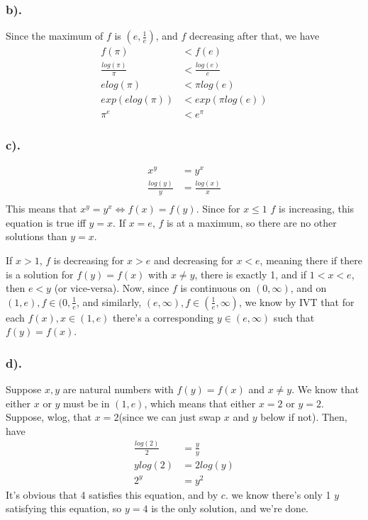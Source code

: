 \documentclass{article}
\begin{document}
\subsubsection*{b).}
Since the maximum of $f$ is $(e, \frac{1}{e})$, and $f$ decreasing after that, we have 
\begin{align*}
f(\pi) &< f(e)\\
\frac{log(\pi)}{\pi} &< \frac{log(e)}{e}\\
e log(\pi) &< \pi log(e)\\
exp(e log(\pi)) &< exp(\pi log(e))\\
\pi^{e} &< e^{\pi}
\end{align*}
\subsubsection*{c).}
\begin{align*}
x^{y} &= y^{x}\\
\frac{log(y)}{y} &= \frac{log(x)}{x}\\
\end{align*}
This means that $x^{y} = y^{x} \iff f(x) = f(y)$. 
Since for $x\leq 1$ $f$ is increasing, this equation is true iff $y = x$. If $x = e$, $f$ is at a maximum, so there are no other solutions than $y=x$. 

If $x > 1$, $f$ is decreasing for $x>e$ and decreasing for $x<e$, meaning there if there is a solution for $f(y) = f(x)$ with $x \neq y$, there is exactly 1, and  if $1 < x < e$, then $ e < y$ (or vice-versa). Now, since $f$ is continuous on $(0, \infty)$, and on $(1, e), f \in (0, \frac{1}{e}$, and similarly, $(e, \infty), f \in (\frac{1}{e}, \infty)$, we know by IVT that for each $f(x), x \in (1, e)$ there's a corresponding $y \in (e, \infty)$ such that $f(y) = f(x)$. 
\subsubsection*{d).}
Suppose $x, y$ are natural numbers with $f(y) = f(x)$ and $x \neq y$. We know that either $x$ or $y$ must be in $(1, e)$, which means that either $x = 2$ or $y = 2$. Suppose, wlog, that $x = 2$(since we can just swap $x$ and $y$ below if not). Then, have \begin{align*}
\frac{log(2)}{2} &= \frac{y}{y}\\
ylog(2) &= 2log(y)\\
2^{y} &= y^{2}
\end{align*}
It's obvious that 4 satisfies this equation, and by $c.$ we know there's only 1 $y$ satisfying this equation, so $y = 4$ is the only solution, and we're done.
\end{document}
